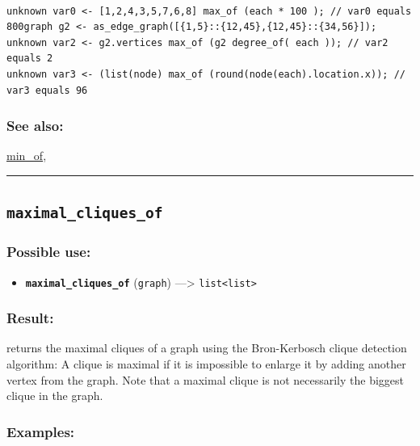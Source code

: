 \documentclass[]{book}
\providecommand{\tightlist}{%
  \setlength{\itemsep}{0pt}\setlength{\parskip}{0pt}}
\theoremstyle{definition}
\theoremstyle{definition}
\theoremstyle{definition}
\theoremstyle{remark}
\begin{document}
\begin{verbatim}
 
unknown var0 <- [1,2,4,3,5,7,6,8] max_of (each * 100 ); // var0 equals 800graph g2 <- as_edge_graph([{1,5}::{12,45},{12,45}::{34,56}]);  
unknown var2 <- g2.vertices max_of (g2 degree_of( each )); // var2 equals 2 
unknown var3 <- (list(node) max_of (round(node(each).location.x)); // var3 equals 96
\end{verbatim}

\subsubsection{See also:}\label{see-also-135}

\href{operators-i-to-m.html\#min_of}{min\_of},

\begin{center}\rule{0.5\linewidth}{\linethickness}\end{center}

\subsection{\texorpdfstring{\texttt{maximal\_cliques\_of}}{maximal\_cliques\_of}}\label{maximal_cliques_of}

\subsubsection{Possible use:}\label{possible-use-342}

\begin{itemize}
\tightlist
\item
  \textbf{\texttt{maximal\_cliques\_of}} (\texttt{graph})
  ---\textgreater{} \texttt{list\textless{}list\textgreater{}}
\end{itemize}

\subsubsection{Result:}\label{result-331}

returns the maximal cliques of a graph using the Bron-Kerbosch clique
detection algorithm: A clique is maximal if it is impossible to enlarge
it by adding another vertex from the graph. Note that a maximal clique
is not necessarily the biggest clique in the graph.

\subsubsection{Examples:}\label{examples-235}
\end{document}
